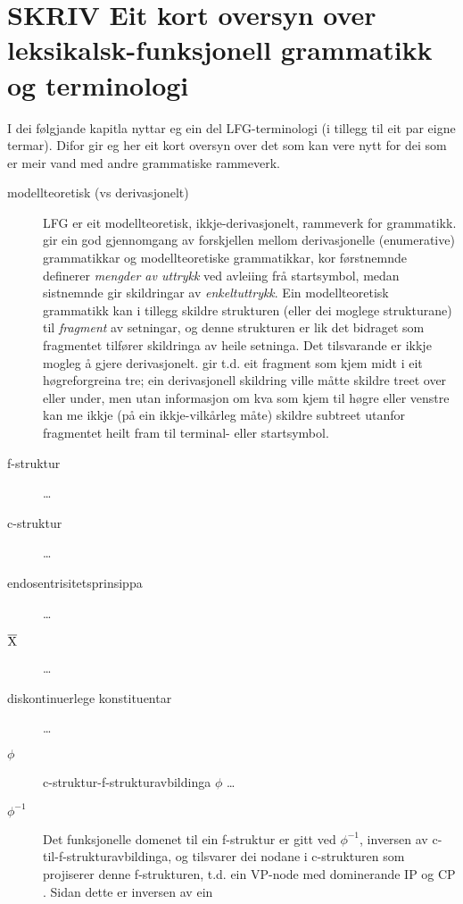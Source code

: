 \documentclass[11pt,a4paper,oneside,draft]{book}
\newcommand{\xbar}{$\rm\overline{X}$}
\begin{document}
\section{\textbf{SKRIV} Eit kort oversyn over leksikalsk-funksjonell grammatikk og terminologi}
\label{sec-2.2}

\label{SEC:omgrepsavklaring}

I dei følgjande kapitla nyttar eg ein del LFG-terminologi (i tillegg
til eit par eigne termar). Difor gir eg her eit kort oversyn over det
som kan vere nytt for dei som er meir vand med andre grammatiske
rammeverk.

\begin{description}
\item [modellteoretisk (vs derivasjonelt)] LFG er eit modellteoretisk,
  ikkje-derivasjonelt, rammeverk for grammatikk.
  \citet{pullum2001dbm} gir ein god gjennomgang av forskjellen mellom
  derivasjonelle (enumerative) grammatikkar og modellteoretiske
  grammatikkar, kor førstnemnde definerer \emph{mengder av uttrykk} ved
  avleiing frå startsymbol, medan sistnemnde gir skildringar av
  \emph{enkeltuttrykk}. Ein modellteoretisk grammatikk kan i tillegg
  skildre strukturen (eller dei moglege strukturane) til \emph{fragment} av
  setningar, og denne strukturen er lik det bidraget som fragmentet
  tilfører skildringa av heile setninga. Det tilsvarande er ikkje
  mogleg å gjere derivasjonelt. \citet[s.~32--33]{pullum2001dbm} gir
  t.d. eit fragment som kjem midt i eit høgreforgreina tre; ein
  derivasjonell skildring ville måtte skildre treet over eller under,
  men utan informasjon om kva som kjem til høgre eller venstre kan me
  ikkje (på ein ikkje-vilkårleg måte) skildre subtreet utanfor
  fragmentet heilt fram til terminal- eller startsymbol.
\item [f-struktur] \ldots{}
\item [c-struktur] \ldots{}
\item [endosentrisitetsprinsippa] \ldots{}
\item [\xbar] \ldots{}
\item [diskontinuerlege konstituentar] \ldots{}
\item [$\phi$] c-struktur-f-strukturavbildinga $\phi$ \ldots{}
\item [$\phi^{-1}$] Det funksjonelle domenet til ein f-struktur er gitt
  ved $\phi^{-1}$, inversen av c-til-f-strukturavbildinga, og
  tilsvarer dei nodane i c-strukturen som projiserer denne
  f-strukturen, t.d. ein VP-node med dominerande IP og CP
  \citep[s.~126]{bresnan2001lfs}. Sidan dette er inversen av ein

\end{description}
\end{document}
